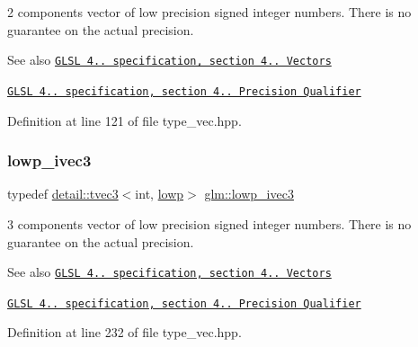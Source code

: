 2 components vector of low precision signed integer numbers. There is no guarantee on the actual precision.

\begin{DoxySeeAlso}{See also}
\href{http://www.opengl.org/registry/doc/GLSLangSpec.4.20.8.pdf}{\tt G\+L\+SL 4.. specification, section 4.. Vectors} 

\href{http://www.opengl.org/registry/doc/GLSLangSpec.4.20.8.pdf}{\tt G\+L\+SL 4.. specification, section 4.. Precision Qualifier} 
\end{DoxySeeAlso}


Definition at line 121 of file type\+\_\+vec.\+hpp.

\mbox{\label{group__core__precision_gad133fec5c629e3f712c1270e15144e6c}} 
\subsubsection{\texorpdfstring{lowp\+\_\+ivec3}{lowp\_ivec3}}
{\footnotesize\ttfamily typedef \hyperlink{structglm_1_1detail_1_1tvec3}{detail\+::tvec3}$<$int, \hyperlink{namespaceglm_a0f04f086094c747d227af4425893f545ae161af3fc695e696ce3bf69f7332bc2d}{lowp}$>$ \hyperlink{group__core__precision_gad133fec5c629e3f712c1270e15144e6c}{glm\+::lowp\+\_\+ivec3}}

3 components vector of low precision signed integer numbers. There is no guarantee on the actual precision.

\begin{DoxySeeAlso}{See also}
\href{http://www.opengl.org/registry/doc/GLSLangSpec.4.20.8.pdf}{\tt G\+L\+SL 4.. specification, section 4.. Vectors} 

\href{http://www.opengl.org/registry/doc/GLSLangSpec.4.20.8.pdf}{\tt G\+L\+SL 4.. specification, section 4.. Precision Qualifier} 
\end{DoxySeeAlso}


Definition at line 232 of file type\+\_\+vec.\+hpp.

\mbox{\label{group__core__precision_gab9b404ae623385d5094499d2d4e4616d}} 
